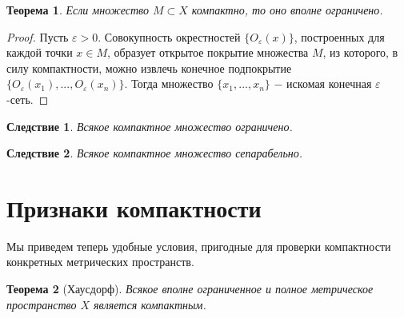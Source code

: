 \documentclass{article}
\newtheorem{theorem}{Теорема}[section]
\newtheorem*{consequence}{Следствие}
\begin{document}
\begin{theorem}
Если множество \(M \subset X\) компактно, то оно вполне ограничено.
\end{theorem}

\begin{proof}
Пусть \(\varepsilon > 0\). Совокупность окрестностей \(\{O_\varepsilon(x)\}\), построенных для каждой точки \(x \in M\), образует открытое покрытие множества \(M\), из которого, в силу компактности, можно извлечь конечное подпокрытие \(\{O_{\varepsilon}(x_1), ..., O_{\varepsilon}(x_n)\}\). Тогда множество \(\{x_1, ..., x_n\}\) \(-\) искомая конечная \(\varepsilon\)-сеть.
\end{proof}

\begin{consequence}
Всякое компактное множество ограничено.
\end{consequence}

\begin{consequence}
Всякое компактное множество сепарабельно.
\end{consequence}

\section{Признаки компактности}

Мы приведем теперь удобные условия, пригодные для проверки компактности конкретных метрических пространств.

\begin{theorem}[Хаусдорф]
Всякое вполне ограниченное и полное метрическое пространство \(X\) является компактным.
\end{theorem}
\end{document}
